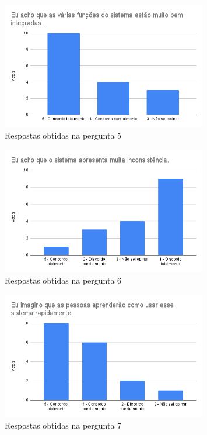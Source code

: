 \documentclass[12pt]{tcc}
\begin{document}
	\begin{figure}[!ht]
		\centering
		\includegraphics[width=0.8\textwidth]{figures/respostas-pergunta-5.png}
		\caption{Respostas obtidas na pergunta 5}
		\label{fig:respostas-pergunta-5}
	\end{figure}

	\begin{figure}[!ht]
		\centering
		\includegraphics[width=0.8\textwidth]{figures/respostas-pergunta-6.png}
		\caption{Respostas obtidas na pergunta 6}
		\label{fig:respostas-pergunta-6}
	\end{figure}

	\begin{figure}[!ht]
		\centering
		\includegraphics[width=0.8\textwidth]{figures/respostas-pergunta-7.png}
		\caption{Respostas obtidas na pergunta 7}
		\label{fig:respostas-pergunta-7}
	\end{figure}
\end{document}

